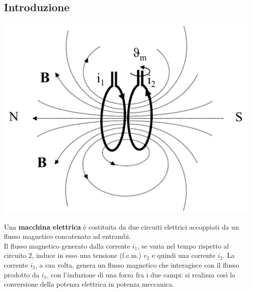 \documentclass{article}
\begin{document}
\subsection{Introduzione}
\begin{center}
    \includegraphics[scale=0.27]{Image/Trasformatore_1.png}
\end{center}
Una \textbf{macchina elettrica} è costituita da due circuiti elettrici accoppiati da un flusso magnetico concatenato ad entrambi.\\
Il flusso magnetico generato dalla corrente $i_1$, se varia nel tempo rispetto al circuito 2, induce in esso una tensione (f.e.m.) $v_2$ e quindi una corrente $i_2$. La corrente $i_2$, a sua volta, genera un flusso magnetico che interagisce con il flusso prodotto da $i_1$, con l'induzione di una forza fra i due campi: si realizza così la conversione della potenza elettrica in potenza meccanica.
\end{document}
